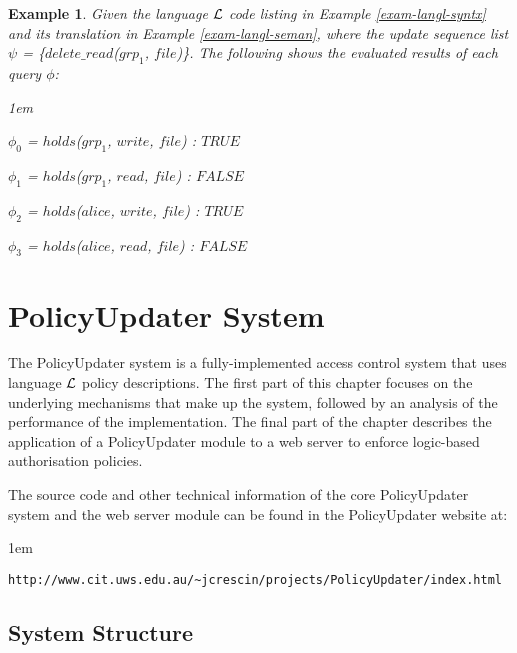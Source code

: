 \documentclass[11pt]{report}
\newtheorem{vexample}{Example}[chapter]
\newenvironment{vquote}
{
  \begin{list}{}{\leftmargin 1em}\item[]
}
{
  \end{list}
}
\begin{document}
      \begin{vexample}
        \label{exam-langl-evalu}
        Given the language ${\cal L}$ code listing in Example
        \ref{exam-langl-syntx} and its translation in Example
        \ref{exam-langl-seman}, where the update sequence list
        $\psi$ = \{$delete\_read$($grp_1$, $file$)\}. The following shows the
        evaluated results of each query $\phi$:

        \begin{vquote}
          $\phi_{0}$ = $holds$($grp_1$, $write$, $file$) : $TRUE$

          $\phi_{1}$ = $holds$($grp_1$, $read$, $file$) : $FALSE$

          $\phi_{2}$ = $holds$($alice$, $write$, $file$) : $TRUE$

          $\phi_{3}$ = $holds$($alice$, $read$, $file$) : $FALSE$
        \end{vquote}
      \end{vexample}

  \chapter{PolicyUpdater System}
    \label{chap-polup}

    The PolicyUpdater system is a fully-implemented access control system
    that uses language ${\cal L}$ policy descriptions. The first part of this
    chapter focuses on the underlying mechanisms that make up the system,
    followed by an analysis of the performance of the implementation. The final
    part of the chapter describes the application of a PolicyUpdater module to
    a web server to enforce logic-based authorisation policies\footnotemark.


    The source code and other technical information of the
    core PolicyUpdater system and the web server module can be found in the
    PolicyUpdater website at:

    \begin{vquote}
      {\tt\scriptsize http://www.cit.uws.edu.au/\~{}jcrescin/projects/PolicyUpdater/index.html}
    \end{vquote}

    \section{System Structure}
      \label{sect-polup-struc}
\end{document}
